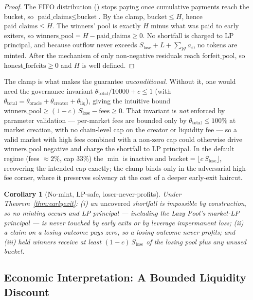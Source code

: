 \documentclass{ledger}
\theoremstyle{plain}
\newtheorem{corollary}{Corollary}
\theoremstyle{remark}
\begin{document}
\begin{proof}
The FIFO distribution () stops paying once cumulative
payments reach the bucket, so $\text{paid\_claims} \le \text{bucket}$. By the
clamp, $\text{bucket} \le H$, hence $\text{paid\_claims} \le H$. The winners'
pool is exactly $H$ minus what was paid to early exiters, so
$\text{winners\_pool} = H - \text{paid\_claims} \ge 0$. No shortfall is charged
to LP principal, and because outflow never exceeds $S_{\text{lose}} + L +
\sum_{\mathcal{W}} a_i$, no tokens are minted. After the mechanism of
 only non-negative residuals reach $\text{forfeit\_pool}$, so
$\text{honest\_forfeits} \ge 0$ and $H$ is well defined.
\end{proof}

The clamp is what makes the guarantee \emph{unconditional}. Without it, one would
need the governance invariant $\theta_{\text{total}}/10000 + c \le 1$ (with
$\theta_{\text{total}} = \theta_{\text{oracle}} + \theta_{\text{creator}} +
\theta_{\text{liq}}$), giving the intuitive bound $\text{winners\_pool} \ge
(1-c)\,S_{\text{lose}} - \text{fees} \ge 0$. That invariant is \emph{not} enforced
by parameter validation --- per-market fees are bounded only by
$\theta_{\text{total}} \le 100\%$ at market creation, with no chain-level cap on
the creator or liquidity fee --- so a valid market with high fees combined with a
non-zero cap could otherwise drive $\text{winners\_pool}$ negative and charge the
shortfall to LP principal. In the default regime (fees $\approx 2\%$, cap $33\%$)
the $\min$ is inactive and $\text{bucket} = \lfloor c\,S_{\text{lose}}\rfloor$,
recovering the intended cap exactly; the clamp binds only in the adversarial
high-fee corner, where it preserves solvency at the cost of a deeper early-exit
haircut.

\begin{corollary}[No-mint, LP-safe, loser-never-profits]
Under Theorem~\ref{thm:earlyexit}: (i) an $\text{uncovered}$ shortfall is
impossible by construction, so no minting occurs and LP principal --- including
the Lazy Pool's market-LP principal --- is never touched by early exits or by
leverage impermanent loss; (ii) a claim on a \emph{losing} outcome pays zero, so
a losing outcome never profits; and (iii) held winners receive at least
$(1-c)\,S_{\text{lose}}$ of the losing pool plus any unused bucket.
\end{corollary}

\subsection{Economic Interpretation: A Bounded Liquidity Discount}\label{sec:defecon}
\end{document}
